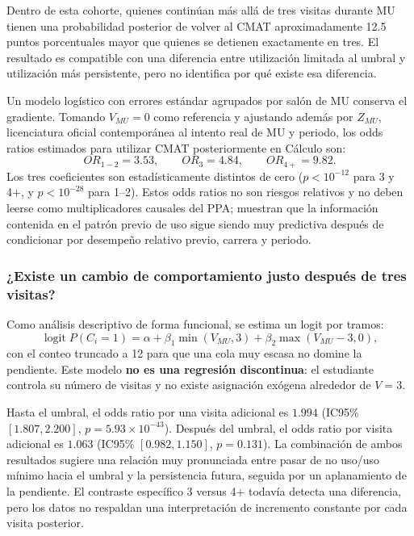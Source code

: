 \begin{answerbox}
Dentro de esta cohorte, quienes continúan más allá de tres visitas durante MU tienen una probabilidad posterior de volver al CMAT aproximadamente 12.5 puntos porcentuales mayor que quienes se detienen exactamente en tres. El resultado es compatible con una diferencia entre utilización limitada al umbral y utilización más persistente, pero no identifica por qué existe esa diferencia.
\end{answerbox}

Un modelo logístico con errores estándar agrupados por salón de MU conserva el gradiente. Tomando $V_{MU}=0$ como referencia y ajustando además por $Z_{MU}$, licenciatura oficial contemporánea al intento real de MU y periodo, los odds ratios estimados para utilizar CMAT posteriormente en Cálculo son:
\[
OR_{1-2}=3.53,
\qquad
OR_{3}=4.84,
\qquad
OR_{4+}=9.82.
\]
Los tres coeficientes son estadísticamente distintos de cero ($p<10^{-12}$ para 3 y 4+, y $p<10^{-28}$ para 1--2). Estos odds ratios no son riesgos relativos y no deben leerse como multiplicadores causales del PPA; muestran que la información contenida en el patrón previo de uso sigue siendo muy predictiva después de condicionar por desempeño relativo previo, carrera y periodo.

\subsubsection{¿Existe un cambio de comportamiento justo después de tres visitas?}

Como análisis descriptivo de forma funcional, se estima un logit por tramos:
\[
\operatorname{logit}P(C_i=1)
=\alpha+\beta_1\min(V_{MU},3)+\beta_2\max(V_{MU}-3,0),
\]
con el conteo truncado a 12 para que una cola muy escasa no domine la pendiente. Este modelo \textbf{no es una regresión discontinua}: el estudiante controla su número de visitas y no existe asignación exógena alrededor de $V=3$.

Hasta el umbral, el odds ratio por una visita adicional es $1.994$ (IC95\% $[1.807,2.200]$, $p=5.93\times10^{-43}$). Después del umbral, el odds ratio por visita adicional es $1.063$ (IC95\% $[0.982,1.150]$, $p=0.131$). La combinación de ambos resultados sugiere una relación muy pronunciada entre pasar de no uso/uso mínimo hacia el umbral y la persistencia futura, seguida por un aplanamiento de la pendiente. El contraste específico 3 versus 4+ todavía detecta una diferencia, pero los datos no respaldan una interpretación de incremento constante por cada visita posterior.

